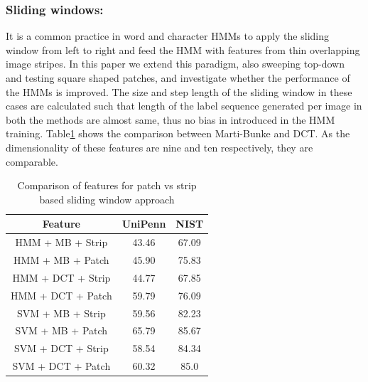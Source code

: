 \documentclass[runningheads]{llncs}
\begin{document}
{\begin{table}[!t]
\begin{tabular}[t]{|c|c|c|c|c|c|}
\end{tabular}
\end{table}

\subsubsection{Sliding windows:}
It is a common practice in word and character HMMs to apply the sliding window from left to right and feed the HMM with features from thin overlapping image stripes. In this paper we extend this paradigm, also sweeping top-down and testing square shaped patches, and investigate whether the performance of the HMMs is improved. The size and step length of the sliding window in these cases are calculated such that length of the label sequence generated per image in both the methods are almost same, thus no bias in introduced in the HMM training. Table{\ref{table02}} shows the comparison between Marti-Bunke and DCT. As the dimensionality of these features are nine and ten respectively, they are comparable. 

\begin{table}[!h]
\caption{Comparison of features for patch vs strip based sliding window approach}
\label{table02}
\centering
\begin{tabular}[t]{|c|c|c|}
\hline
Feature & UniPenn & NIST \\ \hline
HMM + MB + Strip & 43.46 & 67.09 \\ \hline
HMM + MB + Patch & 45.90 & 75.83 \\ \hline
HMM + DCT + Strip & 44.77 & 67.85 \\ \hline
HMM + DCT + Patch & 59.79 & 76.09 \\ \hline \hline
SVM + MB + Strip & 59.56 & 82.23 \\ \hline
SVM + MB + Patch & 65.79 & 85.67 \\ \hline
SVM + DCT + Strip & 58.54 & 84.34 \\ \hline
SVM + DCT + Patch & 60.32 & 85.0 \\ \hline
\end{tabular}
\end{table}

}
\end{document}
